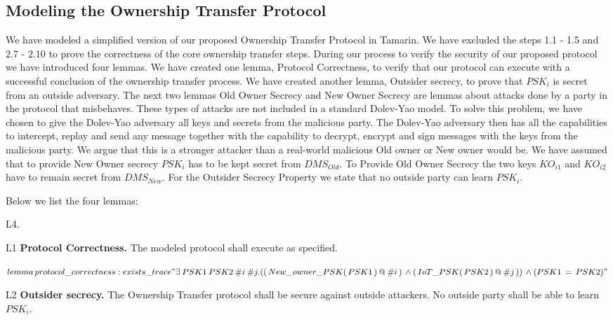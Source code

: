 {\subsection{Modeling the Ownership Transfer Protocol}
We have modeled a simplified version of our proposed Ownership Transfer Protocol in Tamarin. We have excluded the steps 1.1 - 1.5 and 2.7 - 2.10 to prove the correctness of the core ownership transfer steps. During our process to verify the security of our proposed protocol we have introduced four lemmas.
We have created one lemma, Protocol Correctness, to verify that our protocol can execute with a successful conclusion of the ownership transfer process. We have created another lemma, Outsider secrecy, to prove that $PSK_i$ is secret from an outside adversary. The next two lemmas Old Owner Secrecy and New Owner Secrecy are lemmas about attacks done by a party in the protocol that misbehaves. These types of attacks are not included in a standard Dolev-Yao model. To solve this problem, we have chosen to give the Dolev-Yao adversary all keys and secrets from the malicious party. The Dolev-Yao adversary then has all the capabilities to intercept, replay and send any message together with the capability to decrypt, encrypt and sign messages with the keys from the malicious party. We argue that this is a stronger attacker than a real-world malicious Old owner or New owner would be.
We have assumed that to provide New Owner secrecy $PSK_i$ has to be kept secret from $DMS_{Old}$. To Provide Old Owner Secrecy the two keys $KO_{i1}$ and $KO_{i2}$ have to remain secret from $DMS_{New}$. For the Outsider Secrecy Property we state that no outside party can learn $PSK_i$. 

Below we list the four lemmas:
\begin{labeling}{L4.}
\item[L1] \textbf{Protocol Correctness.} The modeled protocol shall execute as specified.

$lemma \, protocol\_correctness: \\
	exists\_trace \\
	" \exists \: PSK1 \: PSK2 \: \#i \: \#j. \\
	(( \, New\_owner\_PSK( \, PSK1 \, ) \, @ \: \#i \, ) \, \wedge \\
 	( \, IoT\_PSK( \, PSK2 \, ) \, @ \: \#j \, )) \, \wedge \\
	(PSK1 \, = \, PSK2)"$

 \item[L2] \textbf{Outsider secrecy.} The Ownership Transfer protocol shall be secure against outside attackers. No outside party shall be able to learn $PSK_i$.


\end{labeling}}
